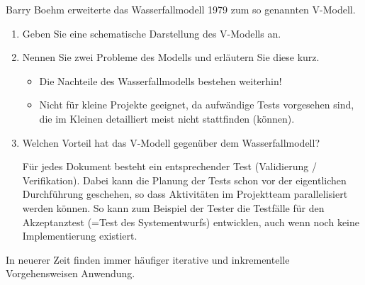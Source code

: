 \documentclass{lehramt-informatik-minimal}
\begin{document}
\noindent
Barry Boehm erweiterte das Wasserfallmodell 1979 zum so genannten
V-Modell.

\begin{enumerate}


\item Geben Sie eine schematische Darstellung des V-Modells an.


\item Nennen Sie zwei Probleme des Modells und erläutern Sie diese kurz.

\begin{antwort}
\begin{itemize}
\item Die Nachteile des Wasserfallmodells bestehen weiterhin!

\item Nicht für kleine Projekte geeignet, da aufwändige Tests vorgesehen
sind, die im Kleinen detailliert meist nicht stattfinden (können).
\end{itemize}
\end{antwort}


\item Welchen Vorteil hat das V-Modell gegenüber dem Wasserfallmodell?

\begin{antwort}
Für jedes Dokument besteht ein entsprechender Test (Validierung /
Verifikation). Dabei kann die Planung der Tests schon vor der
eigentlichen Durchführung geschehen, so dass Aktivitäten im Projektteam
parallelisiert werden können. So kann zum Beispiel der Tester die
Testfälle für den Akzeptanztest (=Test des Systementwurfs) entwicklen,
auch wenn noch keine Implementierung existiert.
\end{antwort}

\end{enumerate}

\noindent
In neuerer Zeit finden immer häufiger iterative und inkrementelle
Vorgehensweisen Anwendung.
\end{document}
